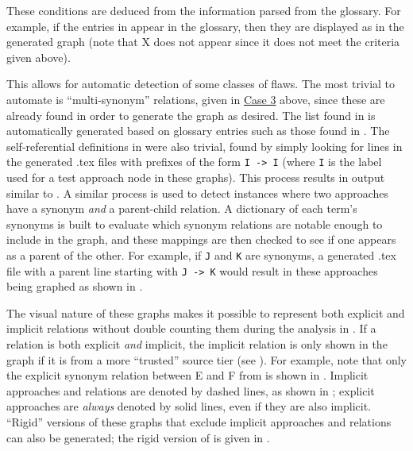     \begin{minipage}{0.35\textwidth}
        These conditions are deduced from the information parsed
        from the glossary. For example, if the entries in 
        appear in the glossary, then they are displayed as 
        in the generated graph (note that X does not appear since it does not
        meet the criteria given above).
    \end{minipage} \newpage

    This allows for automatic detection of some classes of flaws. The
    most trivial to automate is ``multi-synonym'' relations, given in
    \hyperref[case-three]{Case 3} above, since these are already found in order
    to generate the graph as desired. The list found in 
    is automatically generated based on glossary entries such as those found
    in . The self-referential definitions in
     were also trivial, found by simply looking for lines in
    the generated .tex files with prefixes of the form \texttt{I -> I} (where
    \texttt{I} is the label used for a test approach node in these graphs).
    This process results in output similar to . A
    similar process is used to detect instances where two approaches have a
    synonym \emph{and} a parent-child relation. A dictionary of each term's
    synonyms is built to evaluate which synonym relations are notable
    enough to include in the graph, and these mappings are then checked to
    see if one appears as a parent of the other. For example, if \texttt{J}
    and \texttt{K} are synonyms, a generated .tex file with a parent line
    starting with \texttt{J -> K} would result in these approaches being
    graphed as shown in .

    The visual nature of these graphs makes it possible to represent both
    explicit and implicit relations without double counting them during the
    analysis in . If a relation is both explicit
    \emph{and} implicit, the implicit relation is only shown in the graph
    if it is from a more ``trusted'' source tier (see ).
    For example, note that only the explicit synonym relation between E and F
    from  is shown in .
    Implicit approaches and relations are denoted by dashed lines, as shown
    in ; explicit approaches are
    \emph{always} denoted by solid lines, even if they are also implicit.
    ``Rigid'' versions of these graphs that exclude implicit approaches and
    relations can also be generated; the rigid version of
     is given in .

